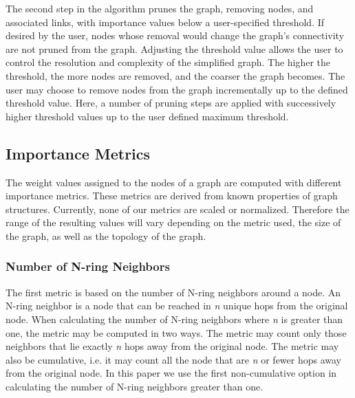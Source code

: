 The second step in the algorithm prunes the graph, removing nodes, and associated links, with importance values below a user-specified threshold.  If desired by the user, nodes whose removal would change the graph's connectivity are not pruned from the graph.  Adjusting the threshold value allows the user to control the resolution and complexity of the simplified graph.  The higher the threshold, the more nodes are removed, and the coarser the graph becomes.  The user may choose to remove nodes from the graph incrementally up to the defined threshold value.  Here, a number of pruning steps are applied with successively higher threshold values up to the user defined maximum threshold.


\subsection{Importance Metrics}
The weight values assigned to the nodes of a graph are computed with different importance metrics.  These metrics are derived from known properties of graph structures.  Currently, none of our metrics are scaled or normalized.  Therefore the range of the resulting values  will vary depending on the metric used, the size of the graph, as well as the topology of the graph.

\subsubsection{Number of N-ring Neighbors}
The first metric is based on the number of N-ring neighbors around a node.  An N-ring neighbor is a node that can be reached in {\em n} unique hops from the original node. When calculating the number of N-ring neighbors where {\em n} is greater than one, the metric may be computed  in two ways.  The metric may count only those neighbors that lie exactly {\em n} hops away from the original node.  The metric may also be cumulative, i.e. it may count all the node that are {\em n} or fewer hops away from the original node.  In this paper we use the first non-cumulative option in calculating the number of N-ring neighbors greater than one.

